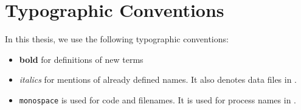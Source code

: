 \section{Typographic Conventions}

In this thesis, we use the following typographic conventions:

\begin{itemize}
\item \textbf{bold} for definitions of new terms

\item \textit{italics} for mentions of already defined names. It also denotes data files in .

\item \texttt{monospace} is used for code and filenames. It is used for process names in .

\end{itemize}
